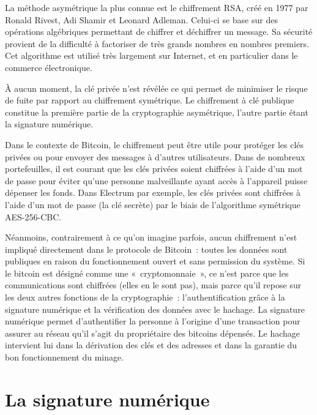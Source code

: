 La méthode asymétrique la plus connue est le chiffrement RSA, créé en 1977 par Ronald Rivest, Adi Shamir et Leonard Adleman. Celui-ci se base sur des opérations algébriques permettant de chiffrer et déchiffrer un message. Sa sécurité provient de la difficulté à factoriser de très grands nombres en nombres premiers. Cet algorithme est utilisé très largement sur Internet, et en particulier dans le commerce électronique.

À aucun moment, la clé privée n'est révélée ce qui permet de minimiser le risque de fuite par rapport au chiffrement symétrique. Le chiffrement à clé publique constitue la première partie de la cryptographie asymétrique, l'autre partie étant la signature numérique.


Dans le contexte de Bitcoin, le chiffrement peut être utile pour protéger les clés privées ou pour envoyer des messages à d'autres utilisateurs. Dans de nombreux portefeuilles, il est courant que les clés privées soient chiffrées à l'aide d'un mot de passe pour éviter qu'une personne malveillante ayant accès à l'appareil puisse dépenser les fonds. Dans Electrum par exemple, les clés privées sont chiffrées à l'aide d'un mot de passe (la clé secrète) par le biais de l'algorithme symétrique AES-256-CBC.

Néanmoins, contrairement à ce qu'on imagine parfois, aucun chiffrement n'est impliqué directement dans le protocole de Bitcoin~: toutes les données sont publiques en raison du fonctionnement ouvert et sans permission du système. Si le bitcoin est désigné comme une «~cryptomonnaie~», ce n'est parce que les communications sont chiffrées (elles en le sont pas), mais parce qu'il repose sur les deux autres fonctions de la cryptographie~: l'authentification grâce à la signature numérique et la vérification des données avec le hachage. La signature numérique permet d'authentifier la personne à l'origine d'une transaction pour assurer au réseau qu'il s'agit du propriétaire des bitcoins dépensés. Le hachage intervient lui dans la dérivation des clés et des adresses et dans la garantie du bon fonctionnement du minage.

\section{La signature numérique}

